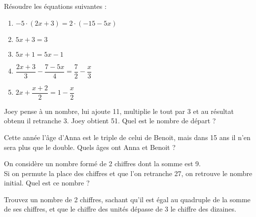 

\begin{exercice}
Résoudre les équations suivantes :
\begin{enumerate}
\item $-5 \cdot (2x+3)=2 \cdot (-15-5x)$
\item $5x+3=3$
\item $5x+1=5x-1$
\item $\dfrac{2x+3}{3}-\dfrac{7-5x}{4}=\dfrac{7}{2}-\dfrac{x}{3}$
\item $2x+\dfrac{x+2}{2}=1-\dfrac{x}{2}$
\end{enumerate}

\end{exercice}


\begin{exercice}
Joey pense à un nombre, lui ajoute 11, multiplie le tout par 3 et au résultat obtenu il retranche 3. Joey obtient 51. Quel est le nombre de départ ?
\end{exercice}

\begin{exercice}
Cette année l’âge d’Anna  est le triple de celui de Benoit, mais dans 15 ans il n’en 	sera plus que le double. Quels âges ont Anna et Benoit ?
\end{exercice}

\begin{exercice}
On considère un nombre formé de 2 chiffres dont la somme est 9.\\
Si on permute la place des chiffres et que l’on retranche 27, on retrouve le nombre 	initial. Quel est ce nombre ?
\end{exercice}

\begin{exercice}
Trouvez un nombre de 2 chiffres, sachant qu'il est égal au quadruple de la somme de ses chiffres, et que le chiffre des unités dépasse de 3 le chiffre des dizaines.
\end{exercice}

